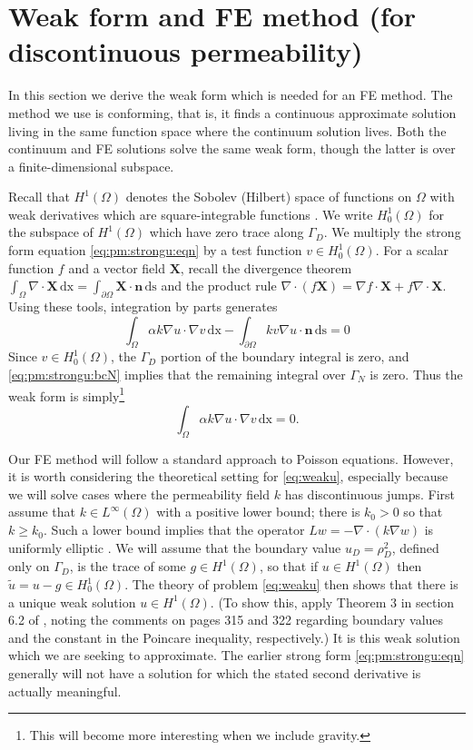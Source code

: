 \documentclass[11pt]{amsart}
\newcommand{\bn}{\mathbf{n}}
\newcommand{\bX}{\mathbf{X}}
\newcommand{\dx}{\mathrm{dx}}
\newcommand{\ds}{\mathrm{ds}}
\newcommand{\Div}{\nabla\cdot}
\newcommand{\grad}{\nabla}
\begin{document}
\section{Weak form and FE method (for discontinuous permeability)}

In this section we derive the weak form which is needed for an FE method.  The method we use is conforming, that is, it finds a continuous approximate solution living in the same function space where the continuum solution lives.  Both the continuum and FE solutions solve the same weak form, though the latter is over a finite-dimensional subspace.

Recall that $H^1(\Omega)$ denotes the Sobolev (Hilbert) space of functions on $\Omega$ with weak derivatives which are square-integrable functions \citep[chapter 5]{Evans2010}.  We write $H_0^1(\Omega)$ for the subspace of $H^1(\Omega)$ which have zero trace along $\Gamma_D$.  We multiply the strong form equation \eqref{eq:pm:strongu:eqn} by a test function $v \in H_0^1(\Omega)$.  For a scalar function $f$ and a vector field $\bX$, recall the divergence theorem $\int_\Omega \Div \bX\,\dx = \int_{\partial \Omega} \bX\cdot \bn\,\ds$ and the product rule $\Div(f\bX) = \grad f \cdot \bX + f \Div \bX$.  Using these tools, integration by parts generates
\begin{equation}
\int_\Omega \alpha k \grad u \cdot \grad v\,\dx - \int_{\partial\Omega} k v \grad u \cdot \bn\,\ds = 0 \label{eq:weaku:early}
\end{equation}
Since $v\in H_0^1(\Omega)$, the $\Gamma_D$ portion of the boundary integral is zero, and \eqref{eq:pm:strongu:bcN} implies that the remaining integral over $\Gamma_N$ is zero.  Thus the weak form is simply\footnote{This will become more interesting when we include gravity.}
\begin{equation}
\int_\Omega \alpha k \grad u \cdot \grad v\,\dx = 0. \label{eq:weaku}
\end{equation}

Our FE method will follow a standard approach to Poisson equations.  However, it is worth considering the theoretical setting for \eqref{eq:weaku}, especially because we will solve cases where the permeability field $k$ has discontinuous jumps.  First assume that $k\in L^\infty(\Omega)$ with a positive lower bound; there is $k_0>0$ so that $k \ge k_0$.  Such a lower bound implies that the operator $L w = - \Div(k \grad w)$ is uniformly elliptic \citep[section 6.1]{Evans2010}.  We will assume that the boundary value $u_D = \rho_D^2$, defined only on $\Gamma_D$, is the trace of some $g\in H^1(\Omega)$, so that if $u\in H^1(\Omega)$ then $\tilde u = u - g \in H_0^1(\Omega)$.  The theory of problem \eqref{eq:weaku} then shows that there is a unique weak solution $u\in H^1(\Omega)$.  (To show this, apply Theorem 3 in section 6.2 of \citep{Evans2010}, noting the comments on pages 315 and 322 regarding boundary values and the constant in the Poincare inequality, respectively.)  It is this weak solution which we are seeking to approximate.  The earlier strong form \eqref{eq:pm:strongu:eqn} generally will not have a solution for which the stated second derivative is actually meaningful.
\end{document}
